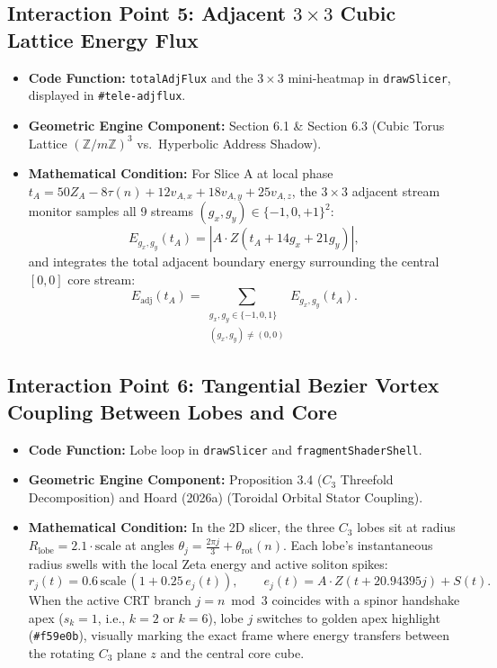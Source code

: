 \documentclass[11pt, a4paper]{article}
\begin{document}
\subsection{Interaction Point 5: Adjacent \texorpdfstring{$3\times 3$}{3x3} Cubic Lattice Energy Flux}
\begin{itemize}
    \item \textbf{Code Function:} \texttt{totalAdjFlux} and the $3\times 3$ mini-heatmap in \texttt{drawSlicer}, displayed in \texttt{\#tele-adjflux}.
    \item \textbf{Geometric Engine Component:} Section 6.1 \& Section 6.3 (Cubic Torus Lattice $(\mathbb{Z}/m\mathbb{Z})^3$ vs.\ Hyperbolic Address Shadow).
    \item \textbf{Mathematical Condition:}
    For Slice A at local phase $t_A = 50 Z_A - 8\tau(n) + 12 v_{A,x} + 18 v_{A,y} + 25 v_{A,z}$, the $3\times 3$ adjacent stream monitor samples all 9 streams $(g_x, g_y) \in \{-1, 0, +1\}^2$:
    \begin{equation}
    E_{g_x, g_y}(t_A) = \left| A \cdot Z(t_A + 14 g_x + 21 g_y) \right|,
    \end{equation}
    and integrates the total adjacent boundary energy surrounding the central $[0,0]$ core stream:
    \begin{equation}
    E_{\text{adj}}(t_A) = \sum_{\substack{g_x, g_y \in \{-1,0,1\} \\ (g_x, g_y) \neq (0,0)}} E_{g_x, g_y}(t_A).
    \end{equation}
\end{itemize}

\subsection{Interaction Point 6: Tangential Bezier Vortex Coupling Between Lobes and Core}
\begin{itemize}
    \item \textbf{Code Function:} Lobe loop in \texttt{drawSlicer} and \texttt{fragmentShaderShell}.
    \item \textbf{Geometric Engine Component:} Proposition 3.4 ($C_3$ Threefold Decomposition) and Hoard (2026a) (Toroidal Orbital Stator Coupling).
    \item \textbf{Mathematical Condition:}
    In the 2D slicer, the three $C_3$ lobes sit at radius $R_{\text{lobe}} = 2.1 \cdot \text{scale}$ at angles $\theta_j = \frac{2\pi j}{3} + \theta_{\text{rot}}(n)$. Each lobe's instantaneous radius swells with the local Zeta energy and active soliton spikes:
    \begin{equation}
    r_j(t) = 0.6\,\text{scale}\,\left(1 + 0.25\,e_j(t)\right), \qquad e_j(t) = A\cdot Z(t + 20.94395 j) + S(t).
    \end{equation}
    When the active CRT branch $j = n \bmod 3$ coincides with a spinor handshake apex ($s_k = 1$, i.e., $k=2$ or $k=6$), lobe $j$ switches to golden apex highlight (\texttt{\#f59e0b}), visually marking the exact frame where energy transfers between the rotating $C_3$ plane $z$ and the central core cube.
\end{itemize}
\end{document}
